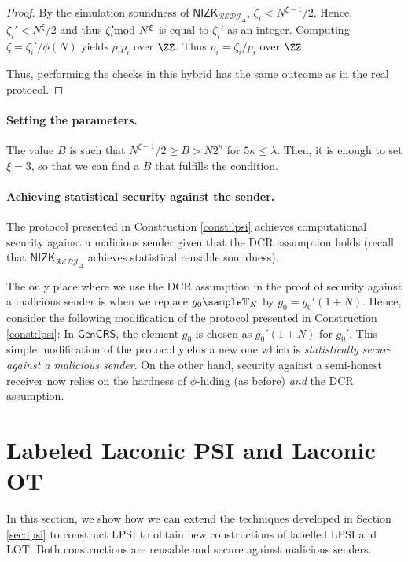\begin{proof}
By the simulation soundness of $\mathsf{NIZK}_{\mathcal{REDJ}_\Delta}$, $\zeta_i<N^{\xi-1}/2$. Hence, $\zeta_i'<N^\xi/2$ and thus $\zeta_i'\!\!\!\!\mod N^\xi$ is equal to $\zeta_i'$ as an integer. Computing $\zeta=\zeta_i'/\phi(N)$ yields $\rho_i p_i$ over $\ZZ$. Thus $\rho_i=\zeta_i/p_i$ over $\ZZ$.

Thus, performing the checks in this hybrid has the same outcome as in the real protocol.

\end{proof}




\paragraph{Setting the parameters.} The value $B$ is such that $N^{\xi-1}/2\geq B >N 2^\kappa $ for $5\kappa\leq \lambda$. Then, it is enough to set $\xi=3$, so that we can find a $B$ that fulfills the condition.

\paragraph{Achieving statistical security against the sender.} The protocol presented in Construction \ref{const:lpsi} achieves computational security against a malicious sender given that the DCR assumption holds (recall that $\mathsf{NIZK}_{\mathcal{REDJ}_\Delta}$ achieves statistical reusable soundness). 

The only place where we use the DCR assumption in the proof of security against a malicious sender is when we replace $g_0\sample \TT_N$ by $g_0=g_0'(1+N)$. Hence, consider the following modification of the protocol presented in Construction \ref{const:lpsi}: In $\mathsf{GenCRS}$, the element $g_0$ is chosen as $g_0'(1+N)$ for $g_0'$. This simple modification of the protocol yields a new one which is \emph{statistically secure against a malicious sender}. On the other hand, security against a semi-honest receiver now relies on the hardness of $\phi$-hiding (as before) \emph{and} the DCR assumption.

\section{Labeled Laconic PSI and Laconic OT}
\label{sec:ExtensionPSI}


In this section, we show how we can extend the techniques developed in Section \ref{sec:lpsi} to construct LPSI to obtain new constructions of labelled LPSI and LOT. Both constructions are reusable and secure against malicious senders.



